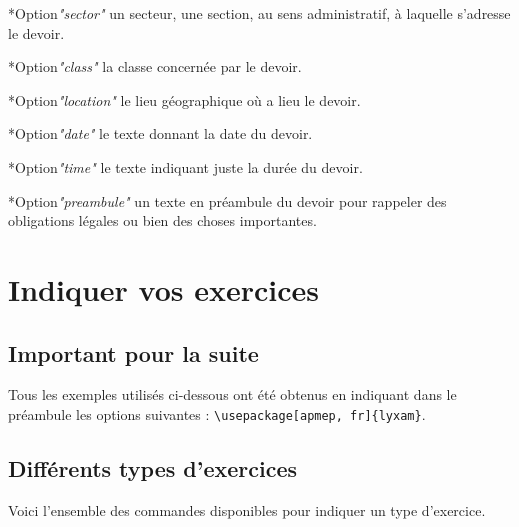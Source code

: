 \documentclass[12pt,a4paper]{article}
\makeatletter
\theoremstyle{definition}
\newcommand\@IDoptarg{\@ifstar{\@IDoptargStar}{\@IDoptargNoStar}}
\newcommand\@IDoptargStar[2]{%
    	\vspace{0.5em}
		--- \texttt{#1%
			\IfStrEq{#2}{}{:}{\,#2:}%
		}%
	}
\newcommand\@IDoptargNoStar[2]{%
    	\IfStrEq{#2}{}{%
			\@IDoptargStar{#1}{}%
		}{%
			\@IDoptargStar{#1}{\##2}%
		}%
	}
\newcommand\IDkey[1]{%
    	\@IDoptarg*{Option}{{\itshape "#1"}}%
	}
\makeatother
\begin{document}
\IDkey{sector} un secteur, une section, au sens administratif, à laquelle s'adresse le devoir.

\IDkey{class} la classe concernée par le devoir.

\IDkey{location} le lieu géographique où a lieu le devoir.

\IDkey{date} le texte donnant la date du devoir.

\IDkey{time} le texte indiquant juste la durée du devoir.

\IDkey{preambule} un texte en préambule du devoir pour rappeler des obligations légales ou bien des choses importantes.




\newcommand\exosoptions{
\IDkey{pts} le nombre de points avec le cas particulier de $0$ qui demande d'afficher "Non noté".

\IDkey{time} la durée de l'exercice.

\IDkey{id} un texte de votre choix pour remplacer le numéro (ceci a pour effet de bloquer temporairement la numérotation).

\IDkey{title} un titre.

\IDkey{note} une petite indication liée à l'exercice (comme par exemple qu'il ne s'adresse qu'aux élèves motivés).

\IDkey{src} la source utilisée pour confectionner l'exercice.
}


\section{Indiquer vos exercices}

    \subsection{Important pour la suite}

Tous les exemples utilisés ci-dessous ont été obtenus en indiquant dans le préambule les options suivantes : \verb+\usepackage[apmep, fr]{lyxam}+.


    \subsection{Différents types d'exercices}

Voici l'ensemble des commandes disponibles pour indiquer un type d'exercice.
\end{document}
